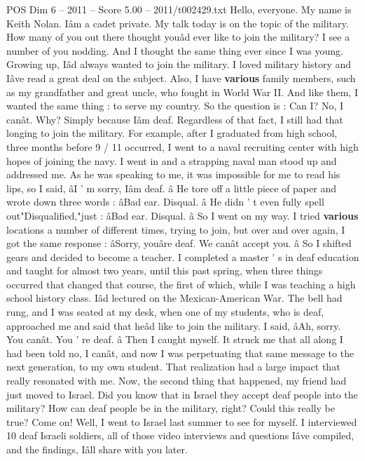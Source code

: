 \begin{textsample}{POS Dim 6 – 2011 – Score 5.00 – 2011/t002429.txt}  \label{ex:f6_pos_033}
Hello, everyone.
My name is Keith Nolan.
Iâm a cadet private.
My talk today is on the topic of the military.
How many of you out there thought youâd ever like to join the military?
I see a number of you nodding.
And I thought the same thing ever since I was young.
Growing up, Iâd always wanted to join the military.
I loved military history and Iâve read a great deal on the subject.
Also, I have \textbf{various} family members, such as my grandfather and great uncle, who fought in World War II.
And like them, I wanted the same thing : to serve my country.
So the question is : Can I?
No, I canât.
Why?
Simply because Iâm deaf.
Regardless of that fact, I still had that longing to join the military.
For example, after I graduated from high school, three months before 9 / 11 occurred, I went to a naval recruiting center with high hopes of joining the navy.
I went in and a strapping naval man stood up and addressed me.
As he was speaking to me, it was impossible for me to read his lips, so I said, âI ' m sorry, Iâm deaf. â He tore off a little piece of paper and wrote down three words : âBad ear.
Disqual. â He didn ' t even fully spell out"Disqualified,"just : âBad ear.
Disqual. â So I went on my way.
I tried \textbf{various} locations a number of different times, trying to join, but over and over again, I got the same response : âSorry, youâre deaf.
We canât accept you. â So I shifted gears and decided to become a teacher.
I completed a master ' s in deaf education and taught for almost two years, until this past spring, when three things occurred that changed that course, the first of which, while I was teaching a high school history class.
Iâd lectured on the Mexican-American War.
The bell had rung, and I was seated at my desk, when one of my students, who is deaf, approached me and said that heâd like to join the military.
I said, âAh, sorry.
You canât.
You ' re deaf. â Then I caught myself.
It struck me that all along I had been told no, I canât, and now I was perpetuating that same message to the next generation, to my own student.
That realization had a large impact that really resonated with me.
Now, the second thing that happened, my friend had just moved to Israel.
Did you know that in Israel they accept deaf people into the military?
How can deaf people be in the military, right?
Could this really be true?
Come on!
Well, I went to Israel last summer to see for myself.
I interviewed 10 deaf Israeli soldiers, all of those video interviews and questions Iâve compiled, and the findings, Iâll share with you later.

\end{textsample}
